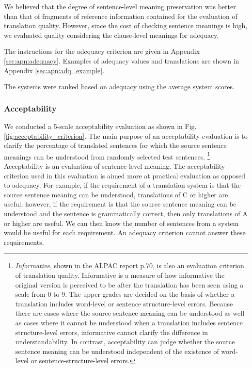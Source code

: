 \documentclass[english]{jnlp_1.4}
\begin{document}
We believed that the degree of sentence-level meaning preservation was better than that of fragments of reference information contained for the evaluation of translation quality. 
However, since the cost of checking sentence meanings is high, we evaluated quality considering the clause-level meanings for adequacy.

The instructions for the adequacy criterion are given in Appendix \ref{sec:apn:adequacy}. 
Examples of adequacy values and translations are shown in Appendix \ref{sec:apn:adq_example}.

The systems were ranked based on adequacy using the average system scores.


\subsubsection{Acceptability}
\label{sec:acceptability}

We conducted a 5-scale acceptability evaluation as shown in Fig. \ref{fig:acceptability_criterion}. 
The main purpose of an acceptability evaluation is to clarify the percentage of translated sentences for which the source sentence meanings can be understood from randomly selected test sentences.
\footnote{\textit{Informative}, shown in the ALPAC report \cite{Pierce-EtAl:ALPAC-report:1966} p.70, is also an evaluation criterion of translation quality. 
Informative is a measure of how informative the original version is perceived to be after the translation has been seen using a scale from 0 to 9. 
The upper grades are decided on the basis of whether a translation includes word-level or sentence structure-level errors. 
Because there are cases where the source sentence meaning can be understood as well as cases where it cannot be understood when a translation includes sentence structure-level errors, informative cannot clarify the difference in understandability. 
In contrast, acceptability can judge whether the source sentence meaning can be understood independent of the existence of word-level or sentence-structure-level errors.} 
Acceptability is an evaluation of sentence-level meaning. 
The acceptability criterion used in this evaluation is aimed more at practical evaluation as opposed to adequacy. 
For example, if the requirement of a translation system is that the source sentence meaning can be understood, translations of C or higher are useful; however, if the requirement is that the source sentence meaning can be understood and the sentence is grammatically correct, then only translations of A or higher are useful. 
We can then know the number of sentences from a system would be useful for each requirement. 
An adequacy criterion cannot answer these requirements.
\end{document}
